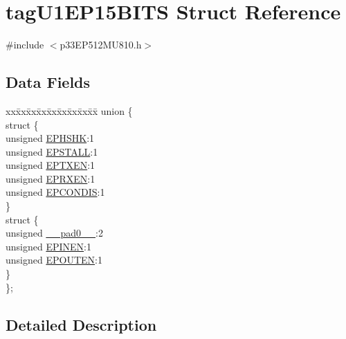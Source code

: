 \hypertarget{structtag_u1_e_p15_b_i_t_s}{}\section{tag\+U1\+E\+P15\+B\+I\+TS Struct Reference}
\label{structtag_u1_e_p15_b_i_t_s}


{\ttfamily \#include $<$p33\+E\+P512\+M\+U810.\+h$>$}

\subsection*{Data Fields}
\begin{DoxyCompactItemize}
\item 
\begin{tabbing}
xx\=xx\=xx\=xx\=xx\=xx\=xx\=xx\=xx\=\kill
union \{\\
\>struct \{\\
\>\>unsigned \hyperlink{structtag_u1_e_p15_b_i_t_s_a0d06430217cb4b189fbe9d0c4b460482}{EPHSHK}:1\\
\>\>unsigned \hyperlink{structtag_u1_e_p15_b_i_t_s_a47042104f04ebe06a23f9789bd400d7e}{EPSTALL}:1\\
\>\>unsigned \hyperlink{structtag_u1_e_p15_b_i_t_s_aa2d88c1be513e759c136823c86a355b4}{EPTXEN}:1\\
\>\>unsigned \hyperlink{structtag_u1_e_p15_b_i_t_s_a8a388d32ceffb87230e660b6793f2857}{EPRXEN}:1\\
\>\>unsigned \hyperlink{structtag_u1_e_p15_b_i_t_s_a1bd26df05d2b5a11b20ee548fce90c3e}{EPCONDIS}:1\\
\>\} \\
\>struct \{\\
\>\>unsigned \hyperlink{structtag_u1_e_p15_b_i_t_s_adf71f3d8410c1f1dbbc96680a92c49af}{\_\_pad0\_\_}:2\\
\>\>unsigned \hyperlink{structtag_u1_e_p15_b_i_t_s_a8b6d98cdf233ac90ff19d16d9a89215e}{EPINEN}:1\\
\>\>unsigned \hyperlink{structtag_u1_e_p15_b_i_t_s_adf87e8acfbb27a5626e21b3e3bd106fd}{EPOUTEN}:1\\
\>\} \\
\}; \\

\end{tabbing}\end{DoxyCompactItemize}


\subsection{Detailed Description}


